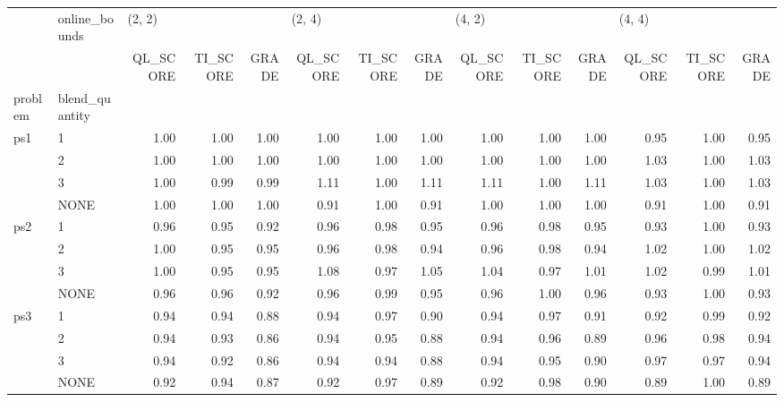 \begin{tabular}{llrrrrrrrrrrrr}
\toprule
    & online\_bounds & \multicolumn{3}{l}{(2, 2)} & \multicolumn{3}{l}{(2, 4)} & \multicolumn{3}{l}{(4, 2)} & \multicolumn{3}{l}{(4, 4)} \\
    & {} & QL\_SCORE & TI\_SCORE & GRADE & QL\_SCORE & TI\_SCORE & GRADE & QL\_SCORE & TI\_SCORE & GRADE & QL\_SCORE & TI\_SCORE & GRADE \\
problem & blend\_quantity &          &          &       &          &          &       &          &          &       &          &          &       \\
\midrule
ps1 & 1 &     1.00 &     1.00 &  1.00 &     1.00 &     1.00 &  1.00 &     1.00 &     1.00 &  1.00 &     0.95 &     1.00 &  0.95 \\
    & 2 &     1.00 &     1.00 &  1.00 &     1.00 &     1.00 &  1.00 &     1.00 &     1.00 &  1.00 &     1.03 &     1.00 &  1.03 \\
    & 3 &     1.00 &     0.99 &  0.99 &     1.11 &     1.00 &  1.11 &     1.11 &     1.00 &  1.11 &     1.03 &     1.00 &  1.03 \\
    & NONE &     1.00 &     1.00 &  1.00 &     0.91 &     1.00 &  0.91 &     1.00 &     1.00 &  1.00 &     0.91 &     1.00 &  0.91 \\
ps2 & 1 &     0.96 &     0.95 &  0.92 &     0.96 &     0.98 &  0.95 &     0.96 &     0.98 &  0.95 &     0.93 &     1.00 &  0.93 \\
    & 2 &     1.00 &     0.95 &  0.95 &     0.96 &     0.98 &  0.94 &     0.96 &     0.98 &  0.94 &     1.02 &     1.00 &  1.02 \\
    & 3 &     1.00 &     0.95 &  0.95 &     1.08 &     0.97 &  1.05 &     1.04 &     0.97 &  1.01 &     1.02 &     0.99 &  1.01 \\
    & NONE &     0.96 &     0.96 &  0.92 &     0.96 &     0.99 &  0.95 &     0.96 &     1.00 &  0.96 &     0.93 &     1.00 &  0.93 \\
ps3 & 1 &     0.94 &     0.94 &  0.88 &     0.94 &     0.97 &  0.90 &     0.94 &     0.97 &  0.91 &     0.92 &     0.99 &  0.92 \\
    & 2 &     0.94 &     0.93 &  0.86 &     0.94 &     0.95 &  0.88 &     0.94 &     0.96 &  0.89 &     0.96 &     0.98 &  0.94 \\
    & 3 &     0.94 &     0.92 &  0.86 &     0.94 &     0.94 &  0.88 &     0.94 &     0.95 &  0.90 &     0.97 &     0.97 &  0.94 \\
    & NONE &     0.92 &     0.94 &  0.87 &     0.92 &     0.97 &  0.89 &     0.92 &     0.98 &  0.90 &     0.89 &     1.00 &  0.89 \\
\bottomrule
\end{tabular}
